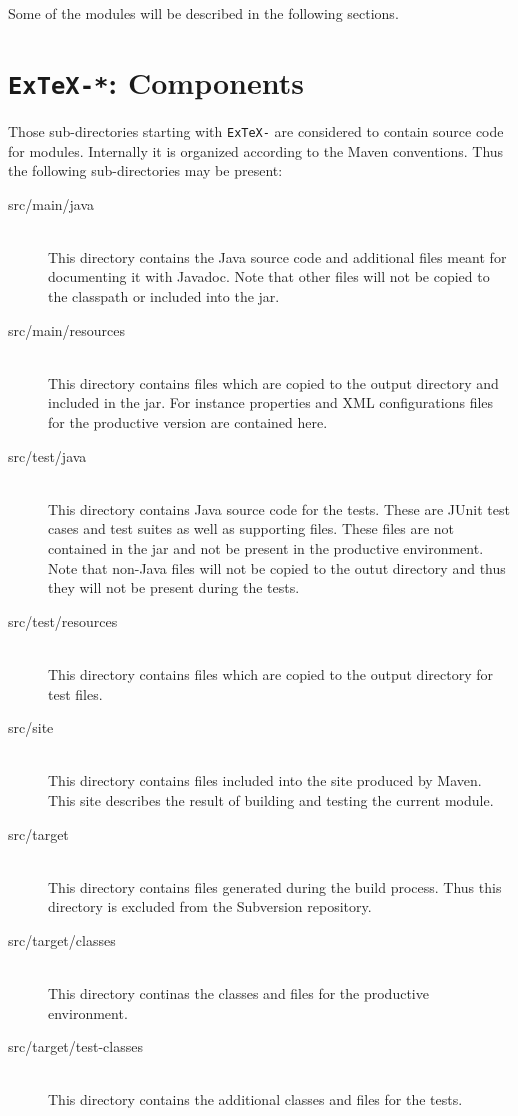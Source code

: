 Some of the modules will be described in the following sections.


\section{\texttt{ExTeX-*}: Components}

Those sub-directories starting with \texttt{ExTeX-} are considered to
contain source code for modules. Internally it is organized according
to the Maven conventions. Thus the following sub-directories may be
present:

\begin{description}
\item[src/main/java] \ \\
  This directory contains the Java source code and additional files
  meant for documenting it with Javadoc. Note that other files will
  not be copied to the classpath or included into the jar.
\item[src/main/resources] \ \\
  This directory contains files which are copied to the output
  directory and included in the jar. For instance properties and XML
  configurations files for the productive version are contained here.
\item[src/test/java] \ \\
  This directory contains Java source code for the tests. These are
  JUnit test cases and test suites as well as supporting files. These
  files are not contained in the jar and not be present in the
  productive environment. Note that non-Java files will not be copied
  to the outut directory and thus they will not be present during the
  tests.
\item[src/test/resources] \ \\
  This directory contains files which are copied to the output
  directory for test files.
\item[src/site] \ \\
  This directory contains files included into the site produced by
  Maven. This site describes the result of building and testing the
  current module.
\item[src/target] \ \\
  This directory contains files generated during the build process.
  Thus this directory is excluded from the Subversion repository.
\item[src/target/classes] \ \\
  This directory continas the classes and files for the productive
  environment.
\item[src/target/test-classes] \ \\
  This directory contains the additional classes and files for the
  tests.
\end{description}

